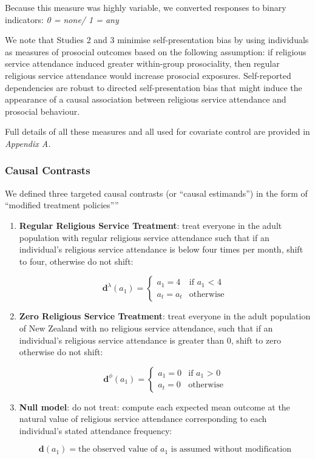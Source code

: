 \documentclass[
  single column]{article}
\begin{document}
Because this measure was highly variable, we converted responses to
binary indicators: \emph{0 = none/ 1 = any}

We note that Studies 2 and 3 minimise self-presentation bias by using
individuals as measures of prosocial outcomes based on the following
assumption: if religious service attendance induced greater within-group
prosociality, then regular religious service attendance would increase
prosocial exposures. Self-reported dependencies are robust to directed
self-presentation bias that might induce the appearance of a causal
association between religious service attendance and prosocial
behaviour.

Full details of all these measures and all used for covariate control
are provided in \emph{Appendix A.}

\subsubsection{Causal Contrasts}\label{causal-contrasts}

We defined three targeted causal contrasts (or ``causal estimands'') in
the form of ``modified treatment policies''''

\begin{enumerate}
\def\labelenumi{\arabic{enumi}.}
\item
  \textbf{Regular Religious Service Treatment}: treat everyone in the
  adult population with regular religious service attendance such that
  if an individual's religious service attendance is below four times
  per month, shift to four, otherwise do not shift:

  \[
  \mathbf{d}^\lambda (a_1) = \begin{cases} a_1 = 4 & \text{if $a_1$ < 4} \\ 
    a_t = a_t & \text{otherwise} \end{cases}
  \]
\item
  \textbf{Zero Religious Service Treatment}: treat everyone in the adult
  population of New Zealand with no religious service attendance, such
  that if an individual's religious service attendance is greater than
  0, shift to zero otherwise do not shift:

  \[
  \mathbf{d}^\phi (a_1) = \begin{cases} a_1 = 0 & \text{if $a_1$ > 0} \\ 
    a_t = 0 & \text{otherwise} \end{cases}
  \]
\item
  \textbf{Null model}: do not treat: compute each expected mean outcome
  at the natural value of religious service attendance corresponding to
  each individual's stated attendance frequency:

  \[
  \mathbf{d}(a_1) = \text{the observed value of $a_1$ is assumed without modification}
  \]
\end{enumerate}
\end{document}
